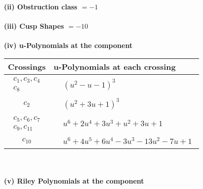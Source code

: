 \documentclass[1p]{elsarticle_modified}
\theoremstyle{definition}
\begin{document}
\flushleft \textbf{(ii) Obstruction class $= -1$}\\~\\
\flushleft \textbf{(iii) Cusp Shapes $= -10$}\\~\\
\newpage\renewcommand{\arraystretch}{1}
\flushleft \textbf{(iv) u-Polynomials at the component}\newline \\
\begin{tabular}{m{50pt}|m{274pt}}
Crossings & \hspace{64pt}u-Polynomials at each crossing \\
\hline $$\begin{aligned}c_{1},c_{3},c_{4}\\c_{8}\end{aligned}$$&$\begin{aligned}
&(u^2- u-1)^3
\end{aligned}$\\
\hline $$\begin{aligned}c_{2}\end{aligned}$$&$\begin{aligned}
&(u^2+3 u+1)^3
\end{aligned}$\\
\hline $$\begin{aligned}c_{5},c_{6},c_{7}\\c_{9},c_{11}\end{aligned}$$&$\begin{aligned}
&u^6+2 u^4+3 u^3+u^2+3 u+1
\end{aligned}$\\
\hline $$\begin{aligned}c_{10}\end{aligned}$$&$\begin{aligned}
&u^6+4 u^5+6 u^4-3 u^3-13 u^2-7 u+1
\end{aligned}$\\
\hline
\end{tabular}\\~\\
\newpage\renewcommand{\arraystretch}{1}
\flushleft \textbf{(v) Riley Polynomials at the component}\newline \\
\end{document}
